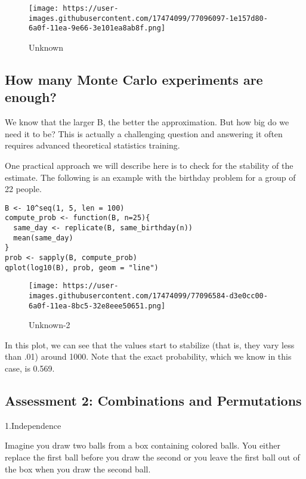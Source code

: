 \documentclass[
]{article}
\begin{document}
\begin{figure}
\centering
\texttt{[image: https://user-images.githubusercontent.com/17474099/77096097-1e157d80-6a0f-11ea-9e66-3e101ea8ab8f.png]}
\caption{Unknown}
\end{figure}

\hypertarget{how-many-monte-carlo-experiments-are-enough}{%
\subsection{How many Monte Carlo experiments are
enough?}\label{how-many-monte-carlo-experiments-are-enough}}

We know that the larger B, the better the approximation. But how big do
we need it to be? This is actually a challenging question and answering
it often requires advanced theoretical statistics training.

One practical approach we will describe here is to check for the
stability of the estimate. The following is an example with the birthday
problem for a group of 22 people.

\begin{verbatim}
B <- 10^seq(1, 5, len = 100)
compute_prob <- function(B, n=25){
  same_day <- replicate(B, same_birthday(n))
  mean(same_day)
}
prob <- sapply(B, compute_prob)
qplot(log10(B), prob, geom = "line")
\end{verbatim}

\begin{figure}
\centering
\texttt{[image: https://user-images.githubusercontent.com/17474099/77096584-d3e0cc00-6a0f-11ea-8bc5-32e8eee50651.png]}
\caption{Unknown-2}
\end{figure}

In this plot, we can see that the values start to stabilize (that is,
they vary less than .01) around 1000. Note that the exact probability,
which we know in this case, is 0.569.

\hypertarget{assessment-2-combinations-and-permutations}{%
\subsection{Assessment 2: Combinations and
Permutations}\label{assessment-2-combinations-and-permutations}}

1.Independence

Imagine you draw two balls from a box containing colored balls. You
either replace the first ball before you draw the second or you leave
the first ball out of the box when you draw the second ball.
\end{document}
